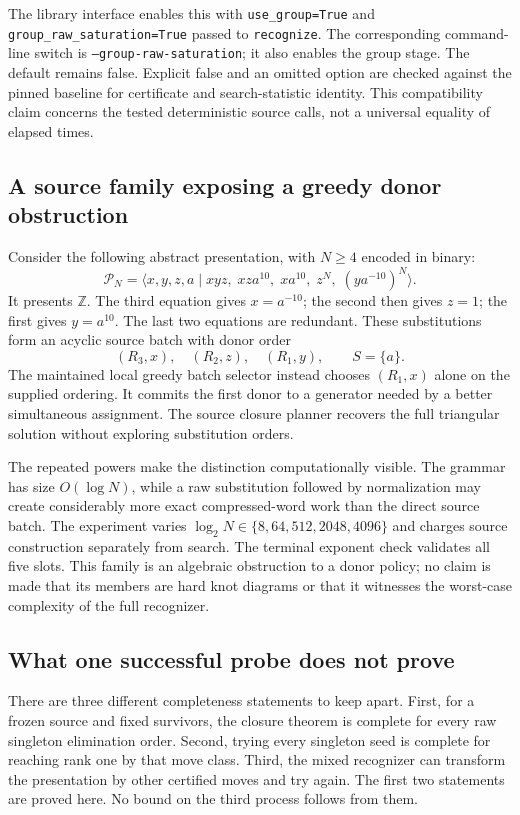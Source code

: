 The library interface enables this with \texttt{use\_group=True} and
\texttt{group\_raw\_saturation=True} passed to \texttt{recognize}.
The corresponding command-line switch is
\texttt{--group-raw-saturation}; it also enables the group stage.
The default remains false. Explicit false and an omitted option are
checked against the pinned baseline for certificate and search-statistic
identity. This compatibility claim concerns the tested deterministic
source calls, not a universal equality of elapsed times.

\subsection{A source family exposing a greedy donor obstruction}

Consider the following abstract presentation, with $N\ge4$ encoded in
binary:
\[
 \mathcal P_N=\langle x,y,z,a\mid
 xyz,\; xza^{10},\; xa^{10},\; z^N,\;
 (ya^{-10})^N\rangle.
\]
It presents $\mathbb Z$. The third equation gives $x=a^{-10}$;
the second then gives $z=1$; the first gives $y=a^{10}$.
The last two equations are redundant. These substitutions form an
acyclic source batch with donor order
\[
 (R_3,x),\quad (R_2,z),\quad (R_1,y),
 \qquad S=\{a\}.
\]
The maintained local greedy batch selector instead chooses
$(R_1,x)$ alone on the supplied ordering. It commits the first donor to a
generator needed by a better simultaneous assignment. The source closure
planner recovers the full triangular solution without exploring
substitution orders.

The repeated powers make the distinction computationally visible. The
grammar has size $O(\log N)$, while a raw substitution followed by
normalization may create considerably more exact compressed-word work
than the direct source batch. The experiment varies
$\log_2 N\in\{8,64,512,2048,4096\}$ and charges source construction
separately from search. The terminal exponent check validates all five
slots. This family is an algebraic obstruction to a donor policy; no claim
is made that its members are hard knot diagrams or that it witnesses the
worst-case complexity of the full recognizer.

\subsection{What one successful probe does not prove}

There are three different completeness statements to keep apart. First,
for a frozen source and fixed survivors, the closure theorem is complete
for every raw singleton elimination order. Second, trying every singleton
seed is complete for reaching rank one by that move class. Third, the
mixed recognizer can transform the presentation by other certified moves
and try again. The first two statements are proved here. No bound on the
third process follows from them.

